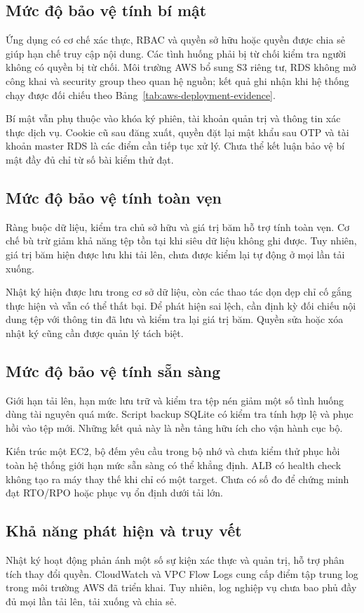 \subsection{Mức độ bảo vệ tính bí mật}
Ứng dụng có cơ chế xác thực, RBAC và quyền sở hữu hoặc quyền được chia sẻ giúp hạn chế truy cập nội dung. Các tình huống phải bị từ chối kiểm tra người không có quyền bị từ chối. Môi trường AWS bổ sung S3 riêng tư, RDS không mở công khai và security group theo quan hệ nguồn; kết quả ghi nhận khi hệ thống chạy được đối chiếu theo Bảng~\ref{tab:aws-deployment-evidence}.

Bí mật vẫn phụ thuộc vào khóa ký phiên, tài khoản quản trị và thông tin xác thực dịch vụ. Cookie cũ sau đăng xuất, quyền đặt lại mật khẩu sau OTP và tài khoản master RDS là các điểm cần tiếp tục xử lý. Chưa thể kết luận bảo vệ bí mật đầy đủ chỉ từ số bài kiểm thử đạt.
\subsection{Mức độ bảo vệ tính toàn vẹn}
Ràng buộc dữ liệu, kiểm tra chủ sở hữu và giá trị băm hỗ trợ tính toàn vẹn. Cơ chế bù trừ giảm khả năng tệp tồn tại khi siêu dữ liệu không ghi được. Tuy nhiên, giá trị băm hiện được lưu khi tải lên, chưa được kiểm lại tự động ở mọi lần tải xuống.

Nhật ký hiện được lưu trong cơ sở dữ liệu, còn các thao tác dọn dẹp chỉ cố gắng thực hiện và vẫn có thể thất bại. Để phát hiện sai lệch, cần định kỳ đối chiếu nội dung tệp với thông tin đã lưu và kiểm tra lại giá trị băm. Quyền sửa hoặc xóa nhật ký cũng cần được quản lý tách biệt.
\subsection{Mức độ bảo vệ tính sẵn sàng}
Giới hạn tải lên, hạn mức lưu trữ và kiểm tra tệp nén giảm một số tình huống dùng tài nguyên quá mức. Script backup SQLite có kiểm tra tính hợp lệ và phục hồi vào tệp mới. Những kết quả này là nền tảng hữu ích cho vận hành cục bộ.

Kiến trúc một EC2, bộ đếm yêu cầu trong bộ nhớ và chưa kiểm thử phục hồi toàn hệ thống giới hạn mức sẵn sàng có thể khẳng định. ALB có health check không tạo ra máy thay thế khi chỉ có một target. Chưa có số đo để chứng minh đạt RTO/RPO hoặc phục vụ ổn định dưới tải lớn.
\subsection{Khả năng phát hiện và truy vết}
Nhật ký hoạt động phản ánh một số sự kiện xác thực và quản trị, hỗ trợ phân tích thay đổi quyền. CloudWatch và VPC Flow Logs cung cấp điểm tập trung log trong môi trường AWS đã triển khai. Tuy nhiên, log nghiệp vụ chưa bao phủ đầy đủ mọi lần tải lên, tải xuống và chia sẻ.

